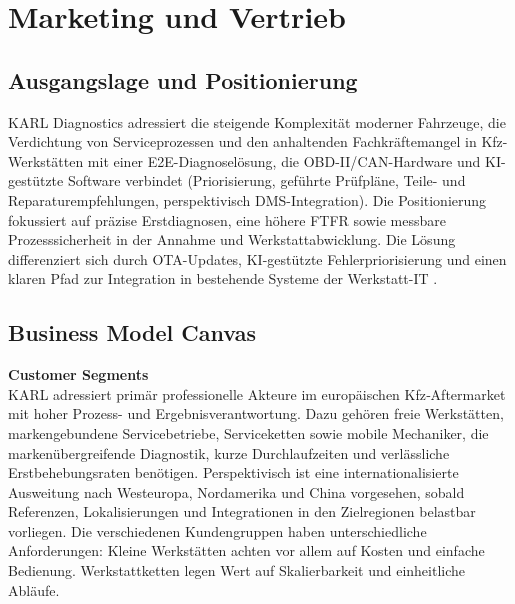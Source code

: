 
\section{Marketing und Vertrieb}
\subsection{Ausgangslage und Positionierung}
\ac{KARL} Diagnostics adressiert die steigende Komplexität moderner Fahrzeuge, die Verdichtung von Serviceprozessen und den anhaltenden Fachkräftemangel in Kfz-Werkstätten mit einer \ac{E2E}-Diagnoselösung, die \ac{OBD}-II/\ac{CAN}-Hardware und KI-gestützte Software verbindet (Priorisierung, geführte Prüfpläne, Teile- und Reparaturempfehlungen, perspektivisch DMS-Integration). Die Positionierung fokussiert auf präzise Erstdiagnosen, eine höhere \ac{FTFR} sowie messbare Prozesssicherheit in der Annahme und Werkstattabwicklung. Die Lösung differenziert sich durch \ac{OTA}-Updates, \ac{KI}-gestützte Fehlerpriorisierung und einen klaren Pfad zur Integration in bestehende Systeme der Werkstatt-IT \citep[vgl.][o.S.]{market-analytics-2025}.

\subsection{Business Model Canvas}
\textbf{Customer Segments}\\
\ac{KARL} adressiert primär professionelle Akteure im europäischen Kfz‑Aftermarket mit hoher Prozess- und Ergebnisverantwortung. Dazu gehören freie Werkstätten, markengebundene Servicebetriebe, Serviceketten sowie mobile Mechaniker, die markenübergreifende Diagnostik, kurze Durchlaufzeiten und verlässliche Erstbehebungsraten benötigen. Perspektivisch ist eine internationalisierte Ausweitung nach Westeuropa, Nordamerika und China vorgesehen, sobald Referenzen, Lokalisierungen und Integrationen in den Zielregionen belastbar vorliegen. Die verschiedenen Kundengruppen haben unterschiedliche Anforderungen: Kleine Werkstätten achten vor allem auf Kosten und einfache Bedienung. Werkstattketten legen Wert auf Skalierbarkeit und einheitliche Abläufe.\\

